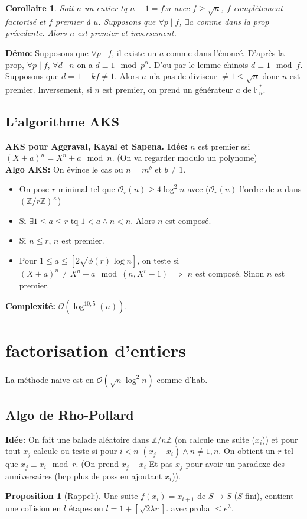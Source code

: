 \documentclass[12pt]{article}
\theoremstyle{plain}
\newtheorem{cor}[subsubsection]{Corollaire}
\theoremstyle{definition}
\newtheorem{prop}[subsubsection]{Proposition}
\newcommand{\Z}{\mathbb{Z}}
\newcommand{\F}{\mathbb{F}}
\newcommand{\Or}{\mathcal{O}}
\begin{document}
\begin{cor}
    Soit $n$ un entier tq $n-1=f.u$ avec $f\geq\sqrt{n}$,
    $f$ complètement factorisé et $f$ premier à $u$. 
    Supposons que $\forall p\mid f$, $\exists a$ comme 
    dans la prop précedente. Alors $n$ est premier et 
    inversement.
\end{cor}
\textbf{Démo:} Supposons que $\forall p\mid f$, il existe 
un $a$ comme dans l'énoncé. D'après la prop, $\forall p\mid f$,
$\forall d\mid n$ on a $d\equiv1\mod p^{\alpha}$. D'ou 
par le lemme chinois $d\equiv 1\mod f$. Supposons que 
$d=1+kf\neq 1$. Alors $n$ n'a pas de diviseur $\neq1\leq 
\sqrt{n}$ donc $n$ est premier. Inversement, si 
$n$ est premier, on prend un générateur $a$ de $\F_n^*$.

\subsection{L'algorithme AKS}
\textbf{AKS pour Aggraval, Kayal et Sapena. Idée:} $n$ 
est premier ssi $(X+a)^n=X^n+a\mod n$. (On va regarder 
modulo un polynome)\\
\indent \textbf{Algo AKS:} On évince le cas ou $n=m^b$ et $b\ne1$.
\begin{itemize}
    \item On pose $r$ minimal tel que $\Or_r(n)\geq 4
    \log^2n$ avec ($\Or_r(n)$ l'ordre de $n$ dans $(\Z/r\Z)^{\times}$)
    \item Si $\exists1\leq a\leq r$ tq $1<a\wedge n<n$. Alors 
    $n$ est composé.
    \item Si $n\leq r$, $n$ est premier.
    \item Pour $1\leq a\leq [2\sqrt{\phi(r)}\log n]$,
    on teste si $(X+a)^n\neq X^n+a\mod (n, X^r-1)\implies$
    $n$ est composé. Sinon $n$ est premier.
\end{itemize}

\textbf{Complexité:} $\Or(\log^{10,5}(n))$.

\section{factorisation d'entiers}
La méthode naive est en $\Or(\sqrt{n}\log^2n)$ comme d'hab.
\subsection{Algo de Rho-Pollard}
\textbf{Idée:} On fait une balade aléatoire dans $\Z/n\Z$
(on calcule une suite ($x_i$)) et pour tout $x_j$ calcule
ou teste si pour $i<n$ $(x_j-x_i)\wedge n\ne1,n$. On obtient
un $r$ tel que $x_j\equiv x_i\mod r$. (On prend $x_j-x_i$ Et
pas $x_j$ pour avoir un paradoxe des anniversaires (bcp plus de poss
en ajoutant $x_i$)). \\
\begin{prop}[Rappel:]
    Une suite $f(x_i)=x_{i+1}$ de $S\to S$ ($S$ fini),
    contient une collision en $l$ étapes ou $l=1+[\sqrt{2\lambda r}]$.
    avec proba $\leq e^{\lambda}$.
\end{prop}
\end{document}
